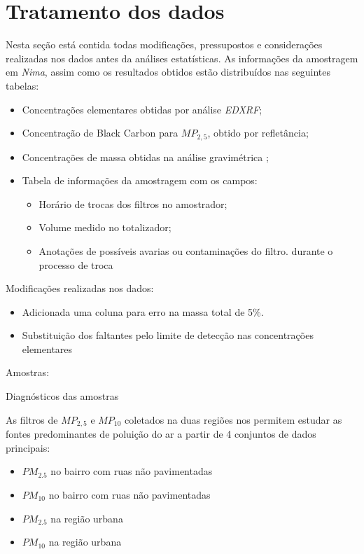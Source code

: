 \section{Tratamento dos dados}

Nesta seção está contida todas modificações, pressupostos e considerações 
realizadas nos dados antes da análises estatísticas.
As informações da amostragem em \textit{Nima}, assim como os resultados obtidos
estão distribuídos nas seguintes tabelas: 

\begin{itemize}
  \item Concentrações elementares obtidas por análise \textit{EDXRF};
  \item Concentração de Black Carbon para $MP_{2,5}$, obtido por refletância;
  \item Concentrações de massa obtidas na análise gravimétrica ;
  \item Tabela de informações da amostragem com os campos:
  \begin{itemize}
    \item Horário de trocas dos filtros no amostrador;
    \item Volume medido no totalizador;
    \item Anotações de possíveis avarias ou contaminações do filtro.
          durante o processo de troca
  \end{itemize}
\end{itemize}

Modificações realizadas nos dados:
\begin{itemize}
\item Adicionada uma coluna para erro na massa total de 5\%.
\item Substituição dos faltantes pelo limite de detecção nas 
      concentrações elementares
\end{itemize}

Amostras:
\begin{table}[H]
  \centering
  
  \caption{Diagnósticos das amostras}
\end{table}

As filtros de $MP_{2,5}$ e $MP_{10}$ coletados na duas regiões nos permitem 
estudar as fontes predominantes de poluição do ar a partir de 4 
conjuntos de dados principais: 

\begin{itemize}
  \item $PM_{2.5}$ no bairro com ruas não pavimentadas
  \item $PM_{10}$ no bairro com ruas não pavimentadas
  \item $PM_{2.5}$ na região urbana
  \item $PM_{10}$ na região urbana
\end{itemize}

